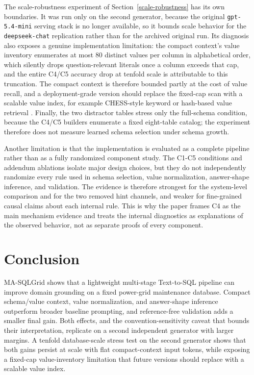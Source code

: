 \documentclass{ieeeaccess}
\begin{document}
The scale-robustness experiment of Section~\ref{scale-robustness} has its own boundaries. It was run only on the second generator, because the original \texttt{gpt-5.4-mini} serving stack is no longer available, so it bounds scale behavior for the \texttt{deepseek-chat} replication rather than for the archived original run. Its diagnosis also exposes a genuine implementation limitation: the compact context's value inventory enumerates at most 80 distinct values per column in alphabetical order, which silently drops question-relevant literals once a column exceeds that cap, and the entire C4/C5 accuracy drop at tenfold scale is attributable to this truncation. The compact context is therefore bounded partly at the cost of value recall, and a deployment-grade version should replace the fixed-cap scan with a scalable value index, for example CHESS-style keyword or hash-based value retrieval \cite{talaei2024chess}. Finally, the two distractor tables stress only the full-schema condition, because the C4/C5 builders enumerate a fixed eight-table catalog; the experiment therefore does not measure learned schema selection under schema growth.

Another limitation is that the implementation is evaluated as a complete pipeline rather than as a fully randomized component study. The C1-C5 conditions and addendum ablations isolate major design choices, but they do not independently randomize every rule used in schema selection, value normalization, answer-shape inference, and validation. The evidence is therefore strongest for the system-level comparison and for the two removed hint channels, and weaker for fine-grained causal claims about each internal rule. This is why the paper frames C4 as the main mechanism evidence and treats the internal diagnostics as explanations of the observed behavior, not as separate proofs of every component.

\section{Conclusion}\label{conclusion}

MA-SQLGrid shows that a lightweight multi-stage Text-to-SQL pipeline can improve domain grounding on a fixed power-grid maintenance database. Compact schema/value context, value normalization, and answer-shape inference outperform broader baseline prompting, and reference-free validation adds a smaller final gain. Both effects, and the convention-sensitivity caveat that bounds their interpretation, replicate on a second independent generator with larger margins. A tenfold database-scale stress test on the second generator shows that both gains persist at scale with flat compact-context input tokens, while exposing a fixed-cap value-inventory limitation that future versions should replace with a scalable value index.
\end{document}
